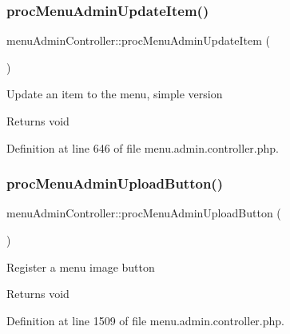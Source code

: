 \hypertarget{classmenuAdminController_a1db2067a684b2a9f71c033f0ee7b185a}{}\label{classmenuAdminController_a1db2067a684b2a9f71c033f0ee7b185a} 
\subsubsection{\texorpdfstring{proc\+Menu\+Admin\+Update\+Item()}{procMenuAdminUpdateItem()}}
{\footnotesize\ttfamily menu\+Admin\+Controller\+::proc\+Menu\+Admin\+Update\+Item (\begin{DoxyParamCaption}{ }\end{DoxyParamCaption})}

Update an item to the menu, simple version \begin{DoxyReturn}{Returns}
void 
\end{DoxyReturn}


Definition at line 646 of file menu.\+admin.\+controller.\+php.

\hypertarget{classmenuAdminController_aa5f219cd08b79ff43eef69c89e7a9fd5}{}\label{classmenuAdminController_aa5f219cd08b79ff43eef69c89e7a9fd5} 
\subsubsection{\texorpdfstring{proc\+Menu\+Admin\+Upload\+Button()}{procMenuAdminUploadButton()}}
{\footnotesize\ttfamily menu\+Admin\+Controller\+::proc\+Menu\+Admin\+Upload\+Button (\begin{DoxyParamCaption}{ }\end{DoxyParamCaption})}

Register a menu image button \begin{DoxyReturn}{Returns}
void 
\end{DoxyReturn}


Definition at line 1509 of file menu.\+admin.\+controller.\+php.

\hypertarget{classmenuAdminController_a7e7dee4ee339e853f91c854f175c0915}{}\label{classmenuAdminController_a7e7dee4ee339e853f91c854f175c0915} 
